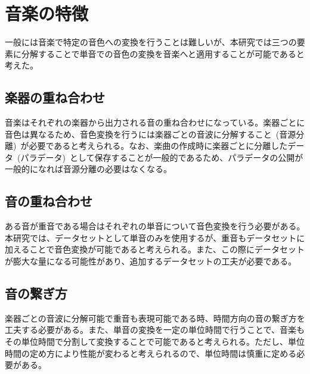 \clearpage



\section{音楽の特徴}

一般には音楽で特定の音色への変換を行うことは難しいが、本研究では三つの要素に分解することで単音での音色の変換を音楽へと適用することが可能であると考えた。

\subsection{楽器の重ね合わせ}
    
音楽はそれぞれの楽器から出力される音の重ね合わせになっている。楽器ごとに音色は異なるため、音色変換を行うには楽器ごとの音波に分解すること~(音源分離)~が必要であると考えられる。なお、楽曲の作成時に楽器ごとに分離したデータ~(パラデータ)~として保存することが一般的であるため、パラデータの公開が一般的になれば音源分離の必要はなくなる。

\subsection{音の重ね合わせ}

ある音が重音である場合はそれぞれの単音について音色変換を行う必要がある。本研究では、データセットとして単音のみを使用するが、重音もデータセットに加えることで音色変換が可能であると考えられる。また、この際にデータセットが膨大な量になる可能性があり、追加するデータセットの工夫が必要である。

\subsection{音の繋ぎ方}

楽器ごとの音波に分解可能で重音も表現可能である時、時間方向の音の繋ぎ方を工夫する必要がある。また、単音の変換を一定の単位時間で行うことで、音楽もその単位時間で分割して変換することで可能であると考えられる。ただし、単位時間の定め方により性能が変わると考えられるので、単位時間は慎重に定める必要がある。


